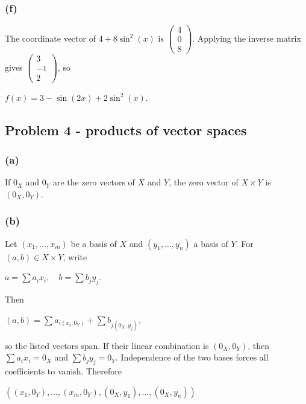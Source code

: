 \subsubsection{(f)}

The coordinate vector of \(4 + 8\sin^{2}(x)\) is \(\begin{pmatrix}
4 \\
0 \\
8
\end{pmatrix}\). Applying the inverse matrix gives \(\begin{pmatrix}
3 \\
{- 1} \\
2
\end{pmatrix}\), so

\(f(x) = 3 - \sin\left( {2x} \right) + 2\sin^{2}(x).\)

\subsection{Problem 4 - products of vector spaces}

\subsubsection{(a)}

If \(0_{X}\) and \(0_{Y}\) are the zero vectors of \(X\) and \(Y\), the zero vector of \(X \times Y\) is \(\left( {0_{X},0_{Y}} \right)\).

\subsubsection{(b)}

Let \(\left( {x_{1},\ldots,x_{m}} \right)\) be a basis of \(X\) and \(\left( {y_{1},\ldots,y_{n}} \right)\) a basis of \(Y\). For \(\left( {a,b} \right) \in X \times Y\), write

\(a = \sum a_{i}x_{i},\quad b = \sum b_{j}y_{j}.\)

Then

\(\left( {a,b} \right) = \sum a_{i{({x_{i},0_{Y}})}} + \sum b_{j{({0_{X},y_{j}})}},\)

so the listed vectors span. If their linear combination is \(\left( {0_{X},0_{Y}} \right)\), then \(\sum a_{i}x_{i} = 0_{X}\) and \(\sum b_{j}y_{j} = 0_{Y}\). Independence of the two bases forces all coefficients to vanish. Therefore

\(\left( {\left( {x_{1},0_{Y}} \right),\ldots,\left( {x_{m},0_{Y}} \right),\left( {0_{X},y_{1}} \right),\ldots,\left( {0_{X},y_{n}} \right)} \right)\)

